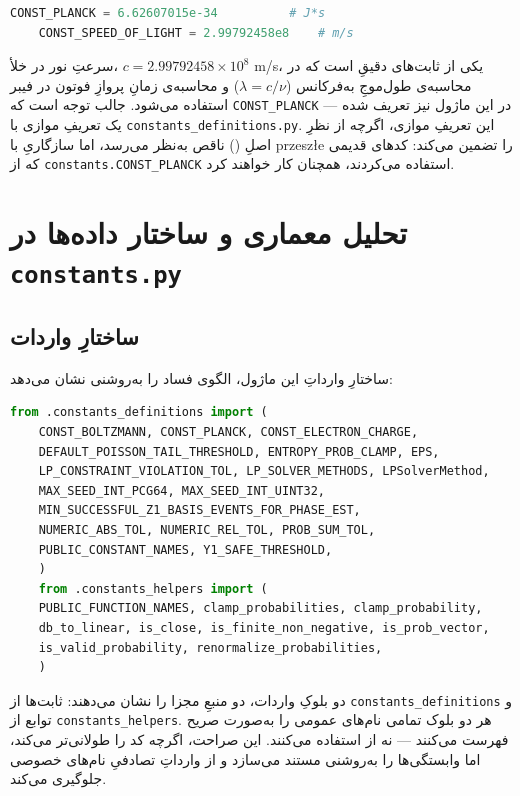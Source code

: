 \begin{lstlisting}[language=Python]
	CONST_PLANCK = 6.62607015e-34          # J*s
	CONST_SPEED_OF_LIGHT = 2.99792458e8    # m/s
\end{lstlisting}

سرعتِ نور در خلأ، $c = 2.99792458 \times 10^8$ m/s، یکی از ثابت‌های دقیقِ  است که در محاسبه‌ی طول‌موجِ به‌فرکانس ($\lambda = c/\nu$) و محاسبه‌ی زمانِ پروازِ فوتون در فیبر استفاده می‌شود. جالب توجه است که \texttt{CONST\_PLANCK} در این ماژول نیز تعریف شده — یک تعریفِ موازی با \texttt{constants\_definitions.py}. این تعریفِ موازی، اگرچه از نظرِ اصلِ  () ناقص به‌نظر می‌رسد، اما سازگاریِ با przeszłe را تضمین می‌کند: کدهای قدیمی که از \texttt{constants.CONST\_PLANCK} استفاده می‌کردند، همچنان کار خواهند کرد.

\section{تحلیل معماری و ساختار داده‌ها در \texttt{constants.py}}

\subsection{ساختارِ واردات}

ساختارِ وارداتِ این ماژول، الگوی فساد را به‌روشنی نشان می‌دهد:

\begin{lstlisting}[language=Python]
	from .constants_definitions import (
	CONST_BOLTZMANN, CONST_PLANCK, CONST_ELECTRON_CHARGE,
	DEFAULT_POISSON_TAIL_THRESHOLD, ENTROPY_PROB_CLAMP, EPS,
	LP_CONSTRAINT_VIOLATION_TOL, LP_SOLVER_METHODS, LPSolverMethod,
	MAX_SEED_INT_PCG64, MAX_SEED_INT_UINT32,
	MIN_SUCCESSFUL_Z1_BASIS_EVENTS_FOR_PHASE_EST,
	NUMERIC_ABS_TOL, NUMERIC_REL_TOL, PROB_SUM_TOL,
	PUBLIC_CONSTANT_NAMES, Y1_SAFE_THRESHOLD,
	)
	from .constants_helpers import (
	PUBLIC_FUNCTION_NAMES, clamp_probabilities, clamp_probability,
	db_to_linear, is_close, is_finite_non_negative, is_prob_vector,
	is_valid_probability, renormalize_probabilities,
	)
\end{lstlisting}

دو بلوکِ واردات، دو منبعِ مجزا را نشان می‌دهند: ثابت‌ها از \texttt{constants\_definitions} و توابع از \texttt{constants\_helpers}. هر دو بلوک تمامی نام‌های عمومی را به‌صورت صریح فهرست می‌کنند — نه از \lr{\texttt{*}} استفاده می‌کنند. این صراحت، اگرچه کد را طولانی‌تر می‌کند، اما وابستگی‌ها را به‌روشنی مستند می‌سازد و از وارداتِ تصادفیِ نام‌های خصوصی جلوگیری می‌کند.

